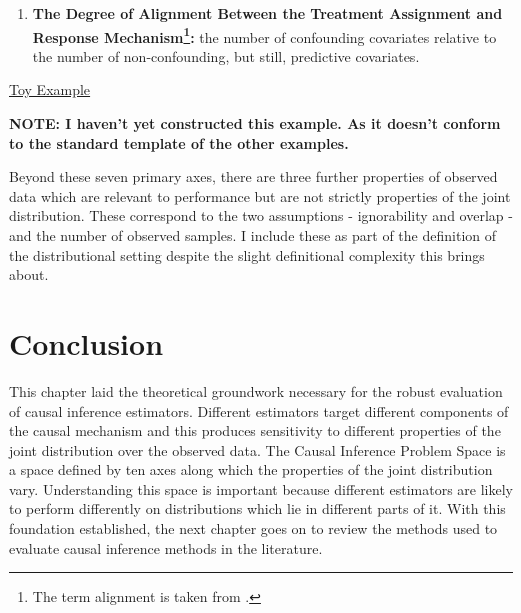\documentclass[../main.tex]{subfiles}
\begin{document}
\begin{enumerate}
\par


\vspace{\baselineskip}
	\item \textbf{The Degree of Alignment Between the Treatment Assignment and Response Mechanism\footnote{ The term alignment is taken from \cite{Kern2016AssessingPopulations}. }: } the number of confounding covariates relative to the number of non-confounding, but still, predictive covariates.
\end{enumerate}\par

\tab 
\vspace{\baselineskip}\begin{adjustwidth}{0.5in}{0.0in}
\uline{Toy Example}\par

\end{adjustwidth}


\vspace{\baselineskip}
\begin{adjustwidth}{0.5in}{0.0in}
\textbf{NOTE: I haven’t yet constructed this example. As it doesn’t conform to the standard template of the other examples.}\par

\end{adjustwidth}


\vspace{\baselineskip}
Beyond these seven primary axes, there are three further properties of observed data which are relevant to performance but are not strictly properties of the joint distribution. These correspond to the two assumptions - ignorability and overlap - and the number of observed samples. I include these as part of the definition of the distributional setting despite the slight definitional complexity this brings about.\par

\section{Conclusion}

\vspace{\baselineskip}
This chapter laid the theoretical groundwork necessary for the robust evaluation of causal inference estimators. Different estimators target different components of the causal mechanism and this produces sensitivity to different properties of the joint distribution over the observed data. The Causal Inference Problem Space is a space defined by ten axes along which the properties of the joint distribution vary. Understanding this space is important because different estimators are likely to perform differently on distributions which lie in different parts of it. With this foundation established, the next chapter goes on to review the methods used to evaluate causal inference methods in the literature.\par
\end{document}
